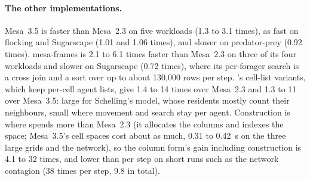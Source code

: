 \paragraph{The other implementations.} Mesa~3.5 is faster than Mesa~2.3 on five workloads
(1.3 to 3.1 times), as fast on flocking and Sugarscape (1.01 and 1.06 times), and slower on predator-prey (0.92
times). mesa-frames is 2.1 to 6.1 times faster than Mesa~2.3 on three of its four workloads and
slower on Sugarscape (0.72 times), where its per-forager search is a cross join and a sort over
up to about 130,000 rows per step. \modelly{}'s cell-list variants, which keep per-cell
agent lists, give 1.4 to 14 times over Mesa~2.3 and 1.3 to 11 over Mesa~3.5: large for
Schelling's model, whose residents mostly count their neighbours, small where movement and
search stay per agent. Construction is where \modelly{} spends more than Mesa~2.3 (it
allocates the columns and indexes the space; Mesa~3.5's cell spaces cost about as much, 0.31
to 0.42~s on the three large grids and the network), so the column form's gain including construction is
4.1 to 32 times, and lower than per step on short runs such as the network contagion (38 times
per step, 9.8 in total).

